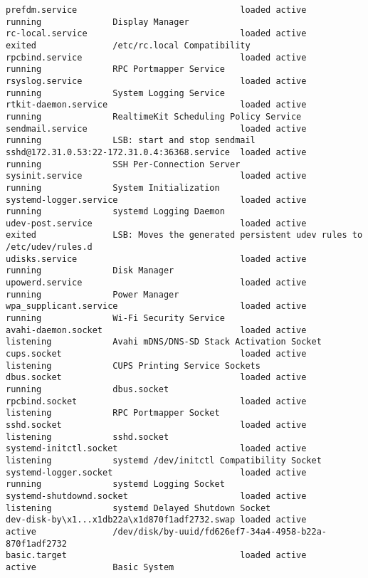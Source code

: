 \documentclass[10pt,oneside,a4paper]{article}
\begin{document}
\begin{landscape}
\begin{Verbatim}[fontsize=\small]
prefdm.service                                loaded active       running              Display Manager
rc-local.service                              loaded active       exited               /etc/rc.local Compatibility
rpcbind.service                               loaded active       running              RPC Portmapper Service
rsyslog.service                               loaded active       running              System Logging Service
rtkit-daemon.service                          loaded active       running              RealtimeKit Scheduling Policy Service
sendmail.service                              loaded active       running              LSB: start and stop sendmail
sshd@172.31.0.53:22-172.31.0.4:36368.service  loaded active       running              SSH Per-Connection Server
sysinit.service                               loaded active       running              System Initialization
systemd-logger.service                        loaded active       running              systemd Logging Daemon
udev-post.service                             loaded active       exited               LSB: Moves the generated persistent udev rules to /etc/udev/rules.d
udisks.service                                loaded active       running              Disk Manager
upowerd.service                               loaded active       running              Power Manager
wpa_supplicant.service                        loaded active       running              Wi-Fi Security Service
avahi-daemon.socket                           loaded active       listening            Avahi mDNS/DNS-SD Stack Activation Socket
cups.socket                                   loaded active       listening            CUPS Printing Service Sockets
dbus.socket                                   loaded active       running              dbus.socket
rpcbind.socket                                loaded active       listening            RPC Portmapper Socket
sshd.socket                                   loaded active       listening            sshd.socket
systemd-initctl.socket                        loaded active       listening            systemd /dev/initctl Compatibility Socket
systemd-logger.socket                         loaded active       running              systemd Logging Socket
systemd-shutdownd.socket                      loaded active       listening            systemd Delayed Shutdown Socket
dev-disk-by\x1...x1db22a\x1d870f1adf2732.swap loaded active       active               /dev/disk/by-uuid/fd626ef7-34a4-4958-b22a-870f1adf2732
basic.target                                  loaded active       active               Basic System

\end{Verbatim}
\end{landscape}
\end{document}
